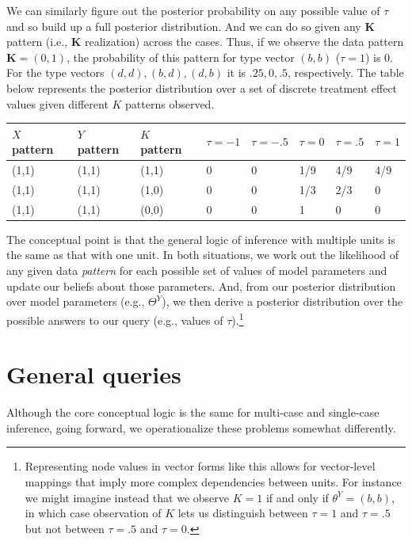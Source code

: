 \documentclass[
  12pt,
]{book}
\begin{document}
We can similarly figure out the posterior probability on any possible value of \(\tau\) and so build up a full posterior distribution. And we can do so given any \(\mathbf K\) pattern (i.e., \(\mathbf K\) realization) across the cases. Thus, if we observe the data pattern \(\mathbf K = (0,1)\), the probability of this pattern for type vector \((b,b)\) (\(\tau = 1\)) is 0. For the type vectors \((d,d), (b, d), (d,b)\) it is \(.25, 0, .5\), respectively. The table below represents the posterior distribution over a set of discrete treatment effect values given different \(K\) patterns observed.

\begin{longtable}[]{@{}llllllll@{}}
\toprule
\(X\) pattern & \(Y\) pattern & \(K\) pattern & \(\tau = -1\) & \(\tau = -.5\) & \(\tau = 0\) & \(\tau = .5\) & \(\tau = 1\) \\
\midrule
\endhead
(1,1) & (1,1) & (1,1) & 0 & 0 & 1/9 & 4/9 & 4/9 \\
(1,1) & (1,1) & (1,0) & 0 & 0 & 1/3 & 2/3 & 0 \\
(1,1) & (1,1) & (0,0) & 0 & 0 & 1 & 0 & 0 \\
\bottomrule
\end{longtable}

The conceptual point is that the general logic of inference with multiple units is the same as that with one unit. In both situations, we work out the likelihood of any given data \emph{pattern} for each possible set of values of model parameters and update our beliefs about those parameters. And, from our posterior distribution over model parameters (e.g., \(\Theta^Y\)), we then derive a posterior distribution over the possible answers to our query (e.g., values of \(\tau\)).\footnote{Representing node values in vector forms like this allows for vector-level mappings that imply more complex dependencies between units. For instance we might imagine instead that we observe \(K=1\) if and only if \(\theta^Y = (b,b)\), in which case observation of \(K\) lets us distinguish between \(\tau = 1\) and \(\tau = .5\) but not between \(\tau = .5\) and \(\tau = 0\).}

\hypertarget{general-queries}{%
\section{General queries}\label{general-queries}}

Although the core conceptual logic is the same for multi-case and single-case inference, going forward, we operationalize these problems somewhat differently.
\end{document}
